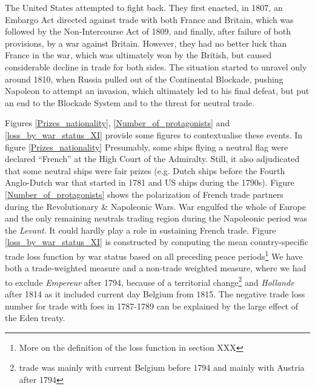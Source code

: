 \documentclass[12pt,a4paper,notitlepage,english]{article}
\begin{document}
The United States attempted to fight back. They first enacted, in 1807, an Embargo Act directed against trade with both France and Britain, which was followed by the Non-Intercourse Act of 1809, and finally, after failure of both provisions, by a war against Britain.
However, they had no better luck than France in the war, which was ultimately won by the British, but caused considerable decline in trade for both sides.
The situation started to unravel only around 1810, when Russia pulled out of the Continental Blockade, pushing Napoleon to attempt an invasion, which ultimately led to his final defeat, but put an end to the Blockade System and to the threat for neutral trade.

Figures \ref{Prizes_nationality}, \ref{Number_of_protagonists} and \ref{loss_by_war_status_XI} provide some figures to contextualise these events. 
In figure \ref{Prizes_nationality}
Presumably, some ships flying a neutral flag were declared ``French'' at the High Court of the Admiralty.
Still, it also adjudicated that some neutral ships were fair prizes (e.g. Dutch ships before the Fourth Anglo-Dutch war that started in 1781 and US ships during the 1790s).
Figure \ref{Number_of_protagonists} shows the polarization of French trade partners during the Revolutionary \& Napoleonic Wars. War engulfed the whole of Europe and the only remaining neutrals trading region during the Napoleonic period was the \textit{Levant}. 
It could hardly play a role in sustaining French trade.
Figure \ref{loss_by_war_status_XI} is constructed by computing the mean country-specific trade loss function by war status based on all preceding peace periods\footnote{More on the definition of the loss function in section XXX}
We have both a trade-weighted measure and a non-trade weighted measure, where we had to exclude \textit{Empereur} after 1794, because of a territorial change\footnote{trade was mainly with current Belgium before 1794 and mainly with Austria after 1794} and \textit{Hollande} after 1814 as it included current day Belgium from 1815.
The negative trade loss number for trade with foes in 1787-1789 can be explained by the large effect of the Eden treaty.
\end{document}
